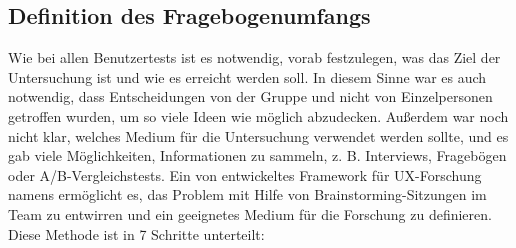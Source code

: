 \subsection{Definition des Fragebogenumfangs}

Wie bei allen Benutzertests ist es notwendig, vorab festzulegen, was das Ziel der Untersuchung ist und wie es erreicht werden soll.
In diesem Sinne war es auch notwendig, dass Entscheidungen von der Gruppe und nicht von Einzelpersonen getroffen wurden, um so viele Ideen wie möglich abzudecken.
Außerdem war noch nicht klar, welches Medium für die Untersuchung verwendet werden sollte, und es gab viele Möglichkeiten, Informationen zu sammeln, z. B. Interviews, Fragebögen oder A/B-Vergleichstests.
Ein von \citeauthor{customerQuestionBoard} entwickeltes Framework für UX-Forschung namens  ermöglicht es, das Problem mit Hilfe von Brainstorming-Sitzungen im Team zu entwirren und ein geeignetes Medium für die Forschung zu definieren.
Diese Methode ist in 7 Schritte unterteilt:


